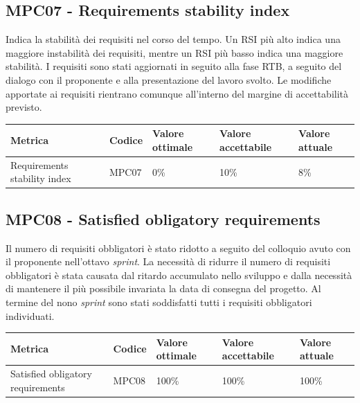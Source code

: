 \subsection{MPC07 - Requirements stability index}
\label{s:mpc07}
Indica la stabilità dei requisiti nel corso del tempo.
Un RSI più alto indica una maggiore instabilità dei requisiti, mentre un RSI più basso indica una maggiore stabilità.
I requisiti sono stati aggiornati in seguito alla fase RTB, a seguito del dialogo con il proponente e alla presentazione del lavoro svolto.
Le modifiche apportate ai requisiti rientrano comunque all'interno del margine di accettabilità previsto.
\begin{table}[H]
    \centering
    \begin{tabularx}{\textwidth}{X|l|l|l|l}
        \hline
        \textbf{Metrica}             & \textbf{Codice} & \textbf{Valore ottimale} & \textbf{Valore accettabile} & \textbf{Valore attuale} \\
        \hline
        Requirements stability index & MPC07           & 0\%                      & 10\%                        & 8\%                  \\
    \end{tabularx}
\end{table}


\subsection{MPC08 - Satisfied obligatory requirements}
\label{s:mpc08}
Il numero di requisiti obbligatori è stato ridotto a seguito del colloquio avuto con il proponente nell'ottavo \textit{sprint}.
La necessità di ridurre il numero di requisiti obbligatori è stata causata dal ritardo accumulato nello sviluppo e dalla necessità di mantenere il più possibile invariata la data di consegna del progetto.
Al termine del nono \textit{sprint} sono stati soddisfatti tutti i requisiti obbligatori individuati.
\begin{table}[H]
    \centering
    \begin{tabularx}{\textwidth}{X|l|l|l|l}
        \hline
        \textbf{Metrica}                  & \textbf{Codice} & \textbf{Valore ottimale} & \textbf{Valore accettabile} & \textbf{Valore attuale} \\
        \hline
        Satisfied obligatory requirements & MPC08           & 100\%                    & 100\%                       & 100\%                   \\
    \end{tabularx}
\end{table}



